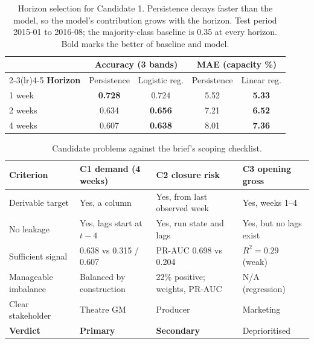 \documentclass[11pt,a4paper]{article}
\begin{document}
\begin{table}[htbp]
\centering
\caption{Horizon selection for Candidate 1. Persistence decays faster than the
model, so the model's contribution grows with the horizon. Test period 2015-01
to 2016-08; the majority-class baseline is 0.35 at every horizon. Bold marks the
better of baseline and model.}
\label{tab:horizon}
\small
\begin{tabular}{@{}lcccc@{}}
\toprule
& \multicolumn{2}{c}{\textbf{Accuracy (3 bands)}} & \multicolumn{2}{c}{\textbf{MAE (capacity \%)}} \\
\cmidrule(lr){2-3}\cmidrule(lr){4-5}
\textbf{Horizon} & Persistence & Logistic reg. & Persistence & Linear reg. \\
\midrule
1 week  & \textbf{0.728} & 0.724 & 5.52 & \textbf{5.33} \\
2 weeks & 0.634 & \textbf{0.656} & 7.21 & \textbf{6.52} \\
4 weeks & 0.607 & \textbf{0.638} & 8.01 & \textbf{7.36} \\
\bottomrule
\end{tabular}
\end{table}

\begin{table}[htbp]
\centering
\caption{Candidate problems against the brief's scoping checklist.}
\label{tab:checklist}
\small
\begin{tabular}{@{}p{2.7cm}p{4.0cm}p{3.7cm}p{3.4cm}@{}}
\toprule
\textbf{Criterion} & \textbf{C1 demand (4 weeks)} & \textbf{C2 closure risk} & \textbf{C3 opening gross} \\
\midrule
Derivable target & Yes, a column & Yes, from last observed week & Yes, weeks 1--4 \\
No leakage & Yes, lags start at $t{-}4$ & Yes, run state and lags & Yes, but no lags exist \\
Sufficient signal & 0.638 vs 0.315 / 0.607 & PR-AUC 0.698 vs 0.204 & $R^2 = 0.29$ (weak) \\
Manageable imbalance & Balanced by construction & 22\% positive; weights, PR-AUC & N/A (regression) \\
Clear stakeholder & Theatre GM & Producer & Marketing \\
\midrule
\textbf{Verdict} & \textbf{Primary} & \textbf{Secondary} & Deprioritised \\
\bottomrule
\end{tabular}
\end{table}
\end{document}
